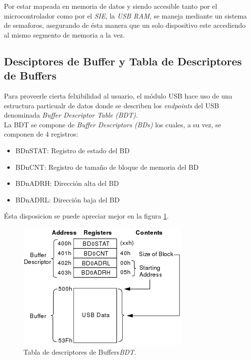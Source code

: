 Por estar mapeada en memoria de datos y siendo accesible tanto por el
microcontrolador como por el \emph{SIE}, la \emph{USB RAM}, se maneja mediante
un sistema de semaforos, asegurando de \'esta manera que un solo dispositivo
este accediendo al mismo segmento de memoria a la vez.

\subsection{Desciptores de Buffer y Tabla de Descriptores de Buffers}
\label{cap:usb_byte}
Para proveerle cierta felxibilidad al usuario, el m\'odulo USB hace uso de
una estructura particualr de datos donde se describen los \emph{endpoints} del
USB denominada \emph{Buffer Descriptor Table (BDT)}. \\

La BDT se compone de \emph{Buffer Descriptors (BDs)} los cuales, a su vez, se
componen de 4 registros:

\begin{itemize}
 \item BDnSTAT: Registro de estado del BD

 \item BDnCNT:  Registro de tama\~no de bloque de memoria del BD

 \item BDnADRH: Direcci\'on alta del BD

 \item BDnADRL: Direcci\'on baja del BD
\end{itemize}

\'Esta disposicion se puede apreciar mejor en la figura \ref{fig:pic_bdt}.

\begin{figure}[htp]
\centering
\includegraphics[scale=0.6]{./img/pic_bdt.png}
\caption{Tabla de descriptores de Buffers\emph{BDT}.}
\label{fig:pic_bdt}
\end{figure}

